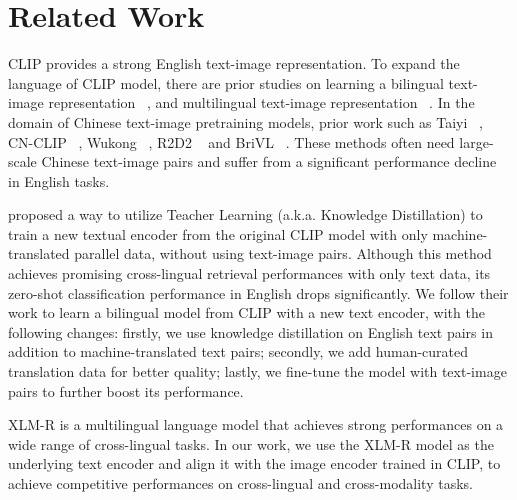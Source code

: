 \section{Related Work}
CLIP \cite{radford2021learning} provides a strong English text-image representation. To expand the language of CLIP model,
there are prior studies on learning a bilingual text-image representation ~\cite{ko2022large, bianchi2021contrastive}, and multilingual text-image representation ~\cite{aggarwal2020towards, carlsson2022cross}. In the domain of Chinese text-image pretraining models, prior work such as Taiyi ~\cite{fengshenbang}, CN-CLIP ~\cite{yang2022chinese}, Wukong ~\cite{gu2022wukong}, R2D2 ~\cite{xie2022zero} and BriVL ~\cite{huo2021wenlan, fei2021wenlan}. These methods often need large-scale Chinese text-image pairs and suffer from a significant performance decline in English tasks.

 proposed a way to utilize Teacher Learning (a.k.a. Knowledge Distillation) \cite{hinton2015distilling} to train a new textual encoder from the original CLIP model with only machine-translated parallel data, without using text-image pairs. Although this method achieves promising cross-lingual retrieval performances with only text data, its zero-shot classification performance in English drops significantly. We follow their work to learn a bilingual model from CLIP with a new text encoder, with the following changes: firstly, we use knowledge distillation on English text pairs in addition to machine-translated text pairs; secondly, we add human-curated translation data for better quality; lastly, we fine-tune the model with text-image pairs to further boost its performance.


XLM-R \cite{conneau2020unsupervised} is a multilingual language model that achieves strong performances on a wide range of cross-lingual tasks. In our work, we use the XLM-R model as the underlying text encoder and align it with the image encoder trained in CLIP, to achieve competitive performances on cross-lingual and cross-modality tasks. 
